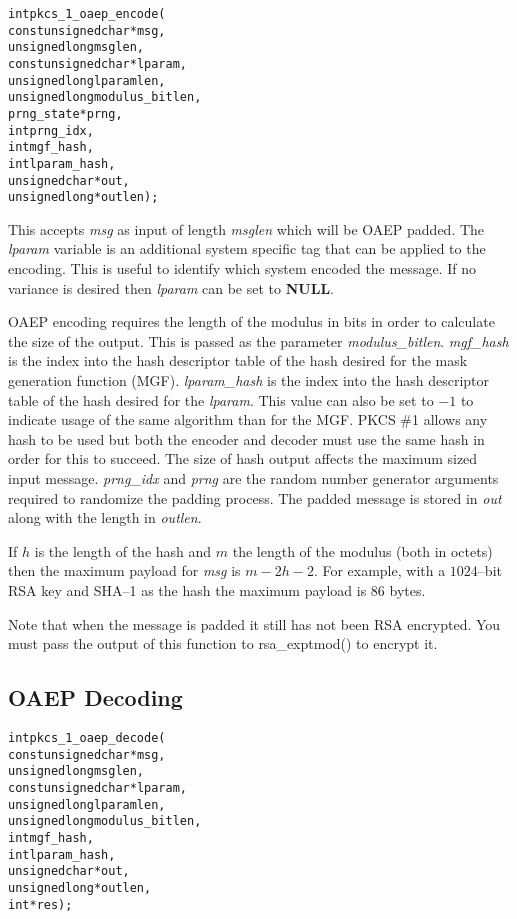 \documentclass[synpaper]{book}
\begin{document}
\begin{alltt}
int pkcs_1_oaep_encode(
    const unsigned char *msg,
          unsigned long  msglen,
    const unsigned char *lparam,
          unsigned long  lparamlen,
          unsigned long  modulus_bitlen,
             prng_state *prng,
                    int  prng_idx,
                    int  mgf_hash,
                    int  lparam_hash,
          unsigned char *out,
          unsigned long *outlen);
\end{alltt}

This accepts \textit{msg} as input of length \textit{msglen} which will be OAEP padded.  The \textit{lparam} variable is an additional system specific
tag that can be applied to the encoding.  This is useful to identify which system encoded the message.  If no variance is desired then
\textit{lparam} can be set to \textbf{NULL}.

OAEP encoding requires the length of the modulus in bits in order to calculate the size of the output.  This is passed as the parameter
\textit{modulus\_bitlen}.  \textit{mgf\_hash} is the index into the hash descriptor table of the hash desired for the mask generation function (MGF).
\textit{lparam\_hash} is the index into the hash descriptor table of the hash desired for the \textit{lparam}.  This value can also be set to $-1$
to indicate usage of the same algorithm than for the MGF.  PKCS \#1 allows any hash to be
used but both the encoder and decoder must use the same hash in order for this to succeed.  The size of hash output affects the maximum
 sized input message.  \textit{prng\_idx} and \textit{prng} are the random number generator arguments required to randomize the padding process.
The padded message is stored in \textit{out} along with the length in \textit{outlen}.

If $h$ is the length of the hash and $m$ the length of the modulus (both in octets) then the maximum payload for \textit{msg} is
$m - 2h - 2$.  For example, with a $1024$--bit RSA key and SHA--1 as the hash the maximum payload is $86$ bytes.

Note that when the message is padded it still has not been RSA encrypted.  You must pass the output of this function to
rsa\_exptmod() to encrypt it.

\subsection{OAEP Decoding}

\begin{alltt}
int pkcs_1_oaep_decode(
    const unsigned char *msg,
          unsigned long  msglen,
    const unsigned char *lparam,
          unsigned long  lparamlen,
          unsigned long  modulus_bitlen,
                    int  mgf_hash,
                    int  lparam_hash,
          unsigned char *out,
          unsigned long *outlen,
                    int *res);
\end{alltt}
\end{document}
